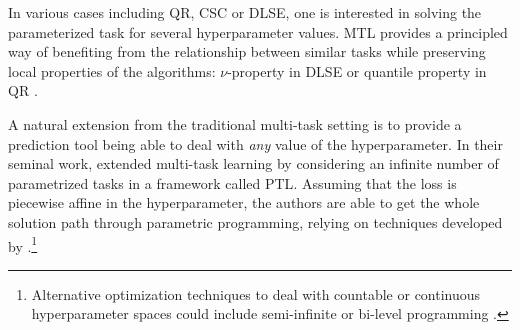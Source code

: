 %
In various cases including \ac{QR}, \ac{CSC} or \ac{DLSE}, one is interested in
solving the parameterized task for several hyperparameter values. \acl{MTL}
\citep{evgeniou2004regularized} provides a principled way of benefiting from
the  relationship between similar tasks  while preserving local properties of
the algorithms: $\nu$-property in \ac{DLSE} \citep{glazer2013q} or quantile
property in \ac{QR} \citep{takeuchi2006nonparametric}. \par

A natural extension from the traditional multi-task setting is to provide a
prediction tool being able to  deal with \emph{any} value of the
hyperparameter. In their seminal work, \citep{takeuchi2013parametric}
extended multi-task learning by considering an infinite number of
parametrized tasks in a framework called \acf{PTL}. Assuming that the loss
is piecewise affine in the hyperparameter, the authors
are able to get the whole solution path
through parametric programming, relying on techniques developed
by \citet{hastie2004entire}.\footnote{Alternative optimization techniques
to deal with countable or continuous hyperparameter spaces could include
semi-infinite \citep{stein2012solve} or bi-level programming \citep{wen1991linear}.}

